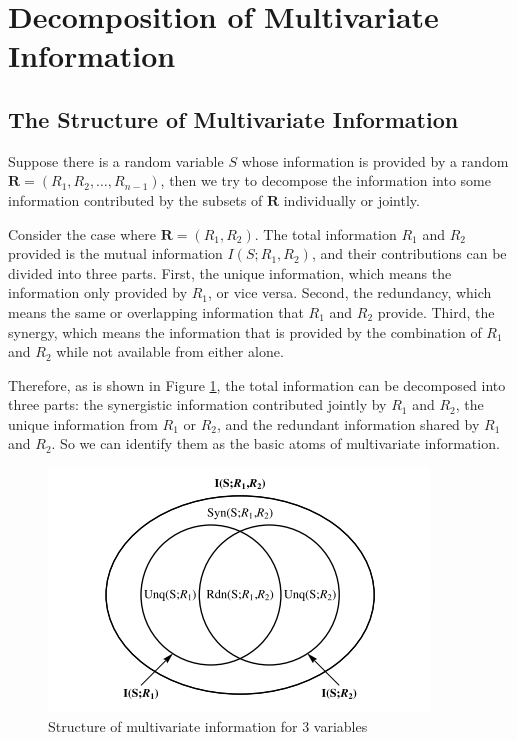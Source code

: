 \section{Decomposition of Multivariate Information}
\subsection{The Structure of Multivariate Information}
Suppose there is a random variable $S$ whose information is provided by a random  $\mathbf{R}=\left({R}_1,{R}_2,\ldots,{R}_{n-1}\right)$, then we try to decompose the information into some information contributed by the subsets of $\mathbf{R}$ individually or jointly.

Consider the case where $\mathbf{R}=\left({R}_1,{R}_2\right)$. The total information ${R_1}$ and ${R_2}$ provided is the mutual
information  $I\left(S;{R}_1,{R}_2\right)$, and their contributions can be divided into three parts. First, the unique information, which means the information only provided by ${R_1}$, or vice versa. Second, the redundancy, which means the same or overlapping information that ${R_1}$ and ${R_2}$ provide. Third, the synergy, which means the information that is provided by the combination of ${R_1}$ and ${R_2}$ while not available from either alone.

Therefore, as is shown in Figure \ref{figl}, the total information can be decomposed into three parts: the synergistic information contributed jointly by ${R_1}$ and ${R_2}$,  the unique information from ${R_1}$ or ${R_2}$, and the redundant information shared by ${R_1}$ and ${R_2}$. So we can identify them as the basic atoms of multivariate information.


 
\begin{figure}[ht]
 
\centering
\includegraphics[scale=0.6]{tex/structure3.png}
\caption{Structure of multivariate information for 3 variables}
\label{figl}
 
\end{figure}



